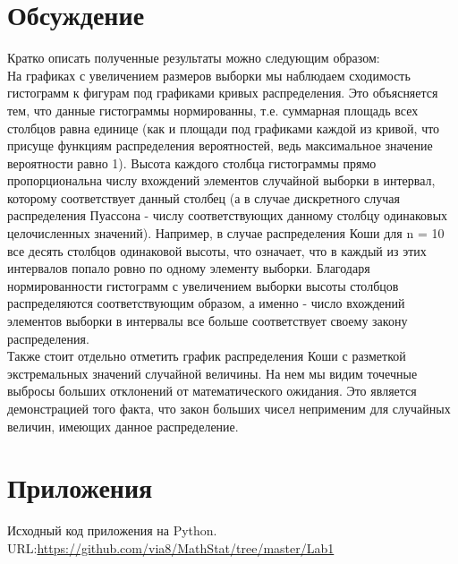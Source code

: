 \documentclass[12pt,a4paper]{article}
\begin{document}
	\section{Обсуждение}
	Кратко описать полученные результаты можно следующим образом:\\
	На графиках с увеличением размеров выборки мы наблюдаем сходимость гистограмм к фигурам под графиками кривых распределения. Это объясняется тем, что данные гистограммы нормированны, т.е. суммарная площадь всех столбцов равна единице (как и площади под графиками каждой из кривой, что присуще функциям распределения вероятностей, ведь максимальное значение вероятности равно 1). Высота каждого столбца гистограммы прямо пропорциональна числу вхождений элементов случайной выборки в интервал, которому соответствует данный столбец (а в случае дискретного случая распределения Пуассона - числу соответствующих данному столбцу одинаковых целочисленных значений). Например, в случае распределения Коши для n = 10 все десять столбцов одинаковой высоты, что означает, что в каждый из этих интервалов попало ровно по одному элементу выборки. Благодаря нормированности гистограмм с увеличением выборки высоты столбцов распределяются соответствующим образом, а именно - число вхождений элементов выборки в интервалы все больше соответствует своему закону распределения.\\
	Также стоит отдельно отметить график распределения Коши с разметкой экстремальных значений случайной величины. На нем мы видим точечные выбросы больших отклонений от математического ожидания. Это является демонстрацией того факта, что закон больших чисел неприменим для случайных величин, имеющих данное распределение.
	\section{Приложения}
	\noindent [1] Исходный код приложения на Python.\\ URL:{\url{https://github.com/via8/MathStat/tree/master/Lab1}}
\end{document}
